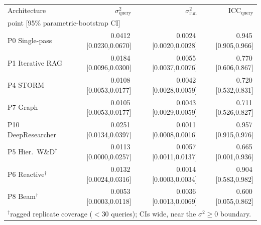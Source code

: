 \begin{tabular}{lrrr}
\toprule
Architecture & $\sigma^2_{\mathrm{query}}$ & $\sigma^2_{\mathrm{run}}$ & ICC$_{\mathrm{query}}$\\
\multicolumn{4}{l}{\footnotesize point [95\% parametric-bootstrap CI]}\\
\midrule
P0 Single-pass & 0.0412\,[0.0230,0.0670] & 0.0024\,[0.0020,0.0028] & 0.945\,[0.905,0.966]\\
P1 Iterative RAG & 0.0184\,[0.0096,0.0300] & 0.0055\,[0.0037,0.0076] & 0.770\,[0.606,0.867]\\
P4 STORM & 0.0108\,[0.0053,0.0177] & 0.0042\,[0.0028,0.0059] & 0.720\,[0.532,0.831]\\
P7 Graph & 0.0105\,[0.0053,0.0177] & 0.0043\,[0.0029,0.0059] & 0.711\,[0.526,0.827]\\
P10 DeepResearcher & 0.0251\,[0.0134,0.0397] & 0.0011\,[0.0008,0.0016] & 0.957\,[0.915,0.976]\\
P5 Hier.\ W\&D$^{\dagger}$ & 0.0113\,[0.0000,0.0257] & 0.0057\,[0.0011,0.0137] & 0.665\,[0.001,0.936]\\
P6 Reactive$^{\dagger}$ & 0.0132\,[0.0024,0.0316] & 0.0014\,[0.0003,0.0034] & 0.904\,[0.583,0.982]\\
P8 Beam$^{\dagger}$ & 0.0053\,[0.0003,0.0118] & 0.0036\,[0.0013,0.0069] & 0.600\,[0.055,0.862]\\
\bottomrule
\multicolumn{4}{l}{\footnotesize $^{\dagger}$ragged replicate coverage ($<30$ queries); CIs wide, near the $\sigma^2{\geq}0$ boundary.}\\
\end{tabular}
